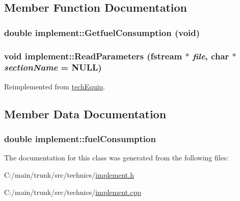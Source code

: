 \subsection{Member Function Documentation}
\hypertarget{classimplement_a836a0f02e755905bae9e8eeea7e80a69}{
\subsubsection[{GetfuelConsumption}]{\setlength{\rightskip}{0pt plus 5cm}double implement::GetfuelConsumption (void)}}
\label{classimplement_a836a0f02e755905bae9e8eeea7e80a69}
\hypertarget{classimplement_ab15a9401469890f3bd902bb007009957}{
\subsubsection[{ReadParameters}]{\setlength{\rightskip}{0pt plus 5cm}void implement::ReadParameters (fstream $\ast$ {\em file}, \/  char $\ast$ {\em sectionName} = {\ttfamily NULL})}}
\label{classimplement_ab15a9401469890f3bd902bb007009957}


Reimplemented from \hyperlink{classtech_equip_a7b8543a8ead2be2a6a00d80123895e2c}{techEquip}.

\subsection{Member Data Documentation}
\hypertarget{classimplement_a87938ec947a5e6d3ad82dca29577302b}{
\subsubsection[{fuelConsumption}]{\setlength{\rightskip}{0pt plus 5cm}double {\bf implement::fuelConsumption}}}
\label{classimplement_a87938ec947a5e6d3ad82dca29577302b}


The documentation for this class was generated from the following files:\begin{DoxyCompactItemize}
\item 
C:/main/trunk/src/technics/\hyperlink{implement_8h}{implement.h}\item 
C:/main/trunk/src/technics/\hyperlink{implement_8cpp}{implement.cpp}\end{DoxyCompactItemize}

